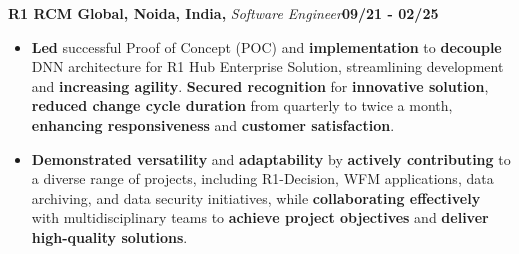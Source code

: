 \documentclass{article}
\newcommand{\subheading}[1]{\textbf{#1}}
\newenvironment{workexp}[3]{%
  \noindent\subheading{#1,} \textit{#2}\hfill\textbf{#3}\par%
}{\bigskip}
\begin{document}
\begin{workexp}{R1 RCM Global, Noida, India}{Software Engineer}{09/21 - 02/25}
\begin{itemize}[left=0pt, align=left]
		\item \textbf{Led} successful Proof of Concept (POC) and
		      \textbf{implementation} to \textbf{decouple} DNN architecture
		      for R1 Hub Enterprise Solution, streamlining development and
		      \textbf{increasing agility}. \textbf{Secured recognition} for
		      \textbf{innovative solution},
		      \textbf{reduced change cycle duration} from quarterly to twice
		      a month, \textbf{enhancing responsiveness} and
		      \textbf{customer satisfaction}.
		          
		\item \textbf{Demonstrated versatility} and \textbf{adaptability} by
		      \textbf{actively contributing} to a diverse range of projects,
		      including R1-Decision, WFM applications, data archiving, and
		      data security initiatives, while
		      \textbf{collaborating effectively} with multidisciplinary
		      teams to \textbf{achieve project objectives} and
		      \textbf{deliver high-quality solutions}.
	\end{itemize}
\end{workexp}
\end{document}

